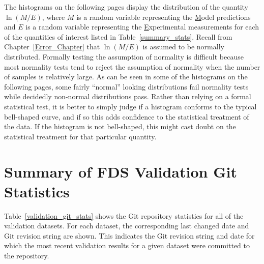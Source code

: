 \documentclass[11pt]{book}
\begin{document}
The histograms on the following pages display the distribution of the quantity $\ln(M/E)$, where $M$ is a random variable representing the \underline{M}odel predictions and $E$ is a random variable representing the \underline{E}xperimental measurements for each of the quantities of interest listed in Table~\ref{summary_stats}. Recall from Chapter~\ref{Error_Chapter} that $\ln(M/E)$ is assumed to be normally distributed. Formally testing the assumption of normality is difficult because most normality tests tend to reject the assumption of normality when the number of samples is relatively large. As can be seen in some of the histograms on the following pages, some fairly ``normal'' looking distributions fail normality tests while decidedly non-normal distributions pass. Rather than relying on a formal statistical test, it is better to simply judge if a histogram conforms to the typical bell-shaped curve, and if so this adds confidence to the statistical treatment of the data. If the histogram is not bell-shaped, this might cast doubt on the statistical treatment for that particular quantity.



\clearpage


\section{Summary of FDS Validation Git Statistics}

Table~\ref{validation_git_stats} shows the Git repository statistics for all of the validation datasets. For each dataset, the corresponding last changed date and Git revision string are shown. This indicates the Git revision string and date for which the most recent validation results for a given dataset were committed to the repository.



\printbibliography[heading=bibintoc,title={References}]
\end{document}
